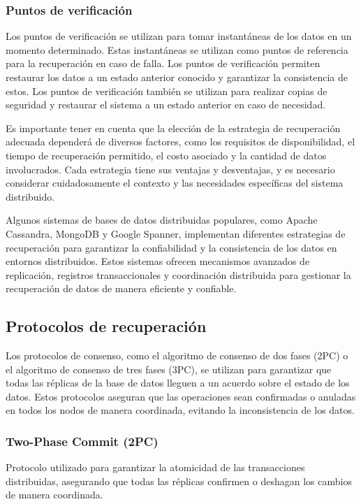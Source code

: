 \subsubsection{Puntos de verificación}
\noindent
Los puntos de verificación se utilizan para tomar instantáneas de los datos en un momento determinado. Estas instantáneas se utilizan como puntos de referencia para la recuperación en caso de falla. Los puntos de verificación permiten restaurar los datos a un estado anterior conocido y garantizar la consistencia de estos. Los puntos de verificación también se utilizan para realizar copias de seguridad y restaurar el sistema a un estado anterior en caso de necesidad.

Es importante tener en cuenta que la elección de la estrategia de recuperación adecuada dependerá de diversos factores, como los requisitos de disponibilidad, el tiempo de recuperación permitido, el costo asociado y la cantidad de datos involucrados. Cada estrategia tiene sus ventajas y desventajas, y es necesario considerar cuidadosamente el contexto y las necesidades específicas del sistema distribuido.

Algunos sistemas de bases de datos distribuidas populares, como Apache Cassandra, MongoDB y Google Spanner, implementan diferentes estrategias de recuperación para garantizar la confiabilidad y la consistencia de los datos en entornos distribuidos. Estos sistemas ofrecen mecanismos avanzados de replicación, registros transaccionales y coordinación distribuida para gestionar la recuperación de datos de manera eficiente y confiable.

\subsection{Protocolos de recuperación}
\noindent
Los protocolos de consenso, como el algoritmo de consenso de dos fases (2PC) o el algoritmo de consenso de tres fases (3PC), se utilizan para garantizar que todas las réplicas de la base de datos lleguen a un acuerdo sobre el estado de los datos. Estos protocolos aseguran que las operaciones sean confirmadas o anuladas en todos los nodos de manera coordinada, evitando la inconsistencia de los datos.

\subsubsection{Two-Phase Commit (2PC)}
\noindent
Protocolo utilizado para garantizar la atomicidad de las transacciones distribuidas, asegurando que todas las réplicas confirmen o deshagan los cambios de manera coordinada.

